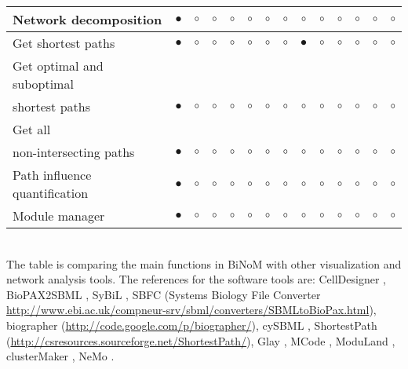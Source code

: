 \documentclass[11pt]{bmc_article_s50}
\newenvironment{bmcformat}{\begin{raggedright}\baselineskip20pt\sloppy\setboolean{publ}{false}}{\end{raggedright}\baselineskip20pt\sloppy}
\begin{document}
\begin{bmcformat}
\begin{sidewaystable}
\begin{tabular}{lccccccccccccc}
        Network decomposition & $\bullet$      &$\circ$&$\circ$& $\circ$      & $\circ$       & $\circ$           & $\circ$     & $\circ$               &  $\circ$      &  $\circ$       &  $\circ$           & $\circ$            &  $\circ$      \\ \hline
        Get shortest paths    & $\bullet$      &$\circ$&$\circ$& $\circ$      & $\circ$       & $\circ$           & $\circ$     & $\bullet$               &  $\circ$      &  $\circ$       &  $\circ$           & $\circ$            &  $\circ$      \\ \hline
        Get optimal and suboptimal & & & & & & & & & & & & &
          \\shortest paths    & $\bullet$      &$\circ$&$\circ$& $\circ$      & $\circ$       & $\circ$           & $\circ$     & $\circ$               &  $\circ$      &  $\circ$       &  $\circ$           & $\circ$            &  $\circ$      \\ \hline
        Get all  & & & & & & & & & & & & &
          \\non-intersecting paths    & $\bullet$      &$\circ$&$\circ$& $\circ$      & $\circ$       & $\circ$           & $\circ$     & $\circ$               &  $\circ$      &  $\circ$       &  $\circ$           & $\circ$            &  $\circ$      \\ \hline
        Path influence quantification & $\bullet$      &$\circ$&$\circ$& $\circ$      & $\circ$       & $\circ$           & $\circ$     & $\circ$               &  $\circ$      &  $\circ$       &  $\circ$           & $\circ$            &  $\circ$      \\ \hline
        Module manager       & $\bullet$      &$\circ$&$\circ$& $\circ$      & $\circ$       & $\circ$           & $\circ$     & $\circ$               &  $\circ$      &  $\circ$       &  $\circ$           & $\circ$            &  $\circ$      \\
        \hline
      \end{tabular}\\
 The table is comparing the main functions in BiNoM with other visualization and network analysis tools. The references for the software tools are: CellDesigner \cite{funahashi2003celldesigner, mi2011biopax}, BioPAX2SBML \cite{buchel2012qualitative}, SyBiL  \cite{ruebenacker2009integrating}, SBFC (Systems Biology File Converter \url{http://www.ebi.ac.uk/compneur-srv/sbml/converters/SBMLtoBioPax.html}),
biographer (\url{http://code.google.com/p/biographer/}), cySBML \cite{konig2012cysbml}, ShortestPath (\url{http://csresources.sourceforge.net/ShortestPath/}), Glay \cite{su2010glay}, MCode \cite{bader2003automated}, ModuLand \cite{szalay2012moduland},
 clusterMaker \cite{morris2011clustermaker}, NeMo \cite{rivera2010nemo}.


\end{sidewaystable}
\end{bmcformat}
\end{document}
